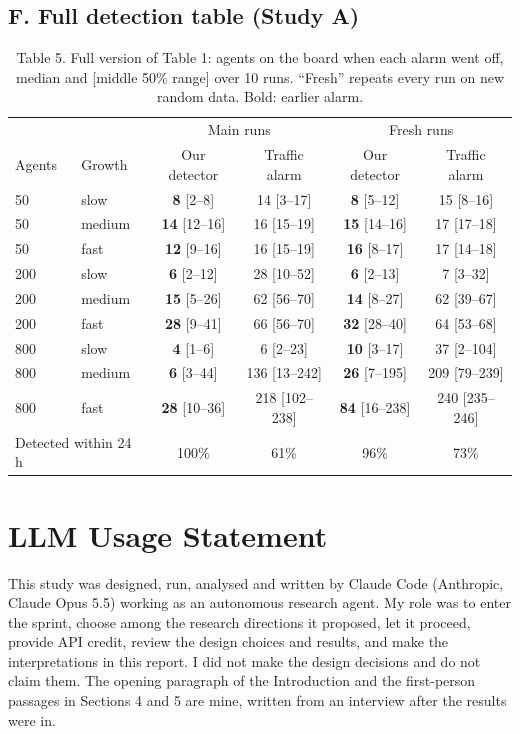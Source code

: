 \documentclass[10pt]{article}
\begin{document}
\subsection*{F. Full detection table (Study A)}
\begin{table}[h]
\centering\small
\caption{Table 5. Full version of Table 1: agents on the board when each alarm went off, median and [middle 50\% range] over 10 runs. ``Fresh'' repeats every run on new random data. Bold: earlier alarm.}
\begin{tabular}{llcccc}
\toprule
& & \multicolumn{2}{c}{Main runs} & \multicolumn{2}{c}{Fresh runs}\\
Agents & Growth & Our detector & Traffic alarm & Our detector & Traffic alarm\\
\midrule
50  & slow   & \textbf{8} [2--8]   & 14 [3--17]    & \textbf{8} [5--12]   & 15 [8--16]\\
50  & medium & \textbf{14} [12--16] & 16 [15--19]  & \textbf{15} [14--16] & 17 [17--18]\\
50  & fast   & \textbf{12} [9--16] & 16 [15--19]   & \textbf{16} [8--17]  & 17 [14--18]\\
200 & slow   & \textbf{6} [2--12]  & 28 [10--52]   & \textbf{6} [2--13]   & 7 [3--32]\\
200 & medium & \textbf{15} [5--26] & 62 [56--70]   & \textbf{14} [8--27]  & 62 [39--67]\\
200 & fast   & \textbf{28} [9--41] & 66 [56--70]   & \textbf{32} [28--40] & 64 [53--68]\\
800 & slow   & \textbf{4} [1--6]   & 6 [2--23]     & \textbf{10} [3--17]  & 37 [2--104]\\
800 & medium & \textbf{6} [3--44]  & 136 [13--242] & \textbf{26} [7--195] & 209 [79--239]\\
800 & fast   & \textbf{28} [10--36] & 218 [102--238] & \textbf{84} [16--238] & 240 [235--246]\\
\midrule
\multicolumn{2}{l}{Detected within 24 h} & 100\% & 61\% & 96\% & 73\%\\
\bottomrule
\end{tabular}
\end{table}

\section*{LLM Usage Statement}
This study was designed, run, analysed and written by Claude Code (Anthropic, Claude Opus 5.5) working as an autonomous research agent. My role was to enter the sprint, choose among the research directions it proposed, let it proceed, provide API credit, review the design choices and results, and make the interpretations in this report. I did not make the design decisions and do not claim them. The opening paragraph of the Introduction and the first-person passages in Sections 4 and 5 are mine, written from an interview after the results were in.
\end{document}
